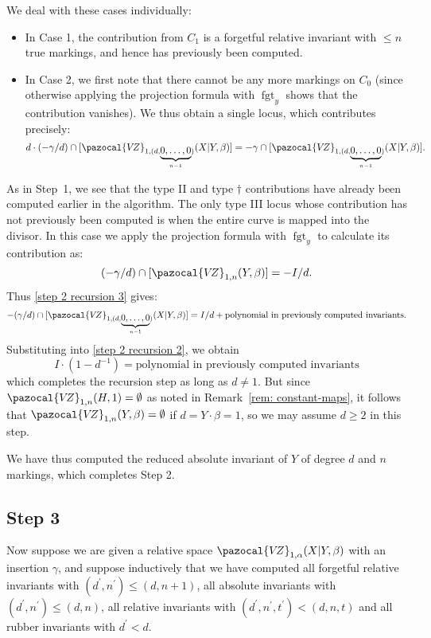 \documentclass[11pt]{amsart}
\newcommand{\VZ}{\pazocal{V\!Z}}
\newcommand{\fgt}{\operatorname{fgt}}
\theoremstyle{definition}
\theoremstyle{definition}
\begin{document}
We deal with these cases individually:
\begin{itemize}
\item In Case 1, the contribution from $C_1$ is a forgetful relative invariant with $\leq n$ true markings, and hence has previously been computed. 
\item In Case 2, we first note that there cannot be any more markings on $C_0$ (since otherwise applying the projection formula with $\fgt_y$ shows that the contribution vanishes). We thus obtain a single locus, which contributes precisely:
\begin{equation*} d\cdot(-\gamma/d) \cap [\VZ_{1,(d,\underbrace{0,\ldots,0}_{n-1})}(X|Y,\beta)] = -\gamma\cap[\VZ_{1,(d,\underbrace{0,\ldots,0}_{n-1})}(X|Y,\beta)].\end{equation*}
\end{itemize}
As in Step~1, we see that the type II and type $\dag$ contributions have already been computed earlier in the algorithm. The only type III locus whose contribution has not previously been computed is when the entire curve is mapped into the divisor. In this case we apply the projection formula with $\fgt_y$ to calculate its contribution as:
\begin{equation*} (-\gamma/d) \cap [\VZ_{1,n}(Y,\beta)] = -I/d.\end{equation*}
Thus \eqref{step 2 recursion 3} gives:
\begin{equation*} -(\gamma/d) \cap [\VZ_{1,(d,\underbrace{0,\ldots,0}_{n-1})}(X|Y,\beta)] = I/d + \text{polynomial in previously computed invariants}.\end{equation*}
Substituting into \eqref{step 2 recursion 2}, we obtain
\begin{equation*} I\cdot(1-d^{-1}) = \text{polynomial in previously computed invariants} \end{equation*}
which completes the recursion step as long as $d \neq 1$. But since $\VZ_{1,n}(H,1)=\emptyset$ as noted in Remark~\ref{rem: constant-maps}, it follows that $\VZ_{1,n}(Y,\beta)=\emptyset$ if $d=Y\cdot\beta=1$, so we may assume $d \geq 2$ in this step.

We have thus computed the reduced absolute invariant of $Y$ of degree $d$ and $n$ markings, which completes Step 2.

\subsection*{Step 3} Now suppose we are given a relative space $\VZ_{1,\alpha}(X|Y,\beta)$ with an insertion $\gamma$, and suppose inductively that we have computed all forgetful relative invariants with $(d^\prime,n^\prime) \leq (d,n+1)$, all absolute invariants with $(d^\prime,n^\prime) \leq (d,n)$, all relative invariants with $(d^\prime,n^\prime,t^\prime)<(d,n,t)$ and all rubber invariants with $d^\prime < d$.
\end{document}
